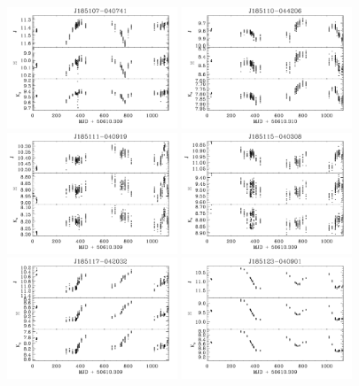 \documentclass[]{emulateapj}
\begin{document}
\begin{figure}[]
\centering
\includegraphics[width=2.0in]{new_plots/ll_22}
\includegraphics[width=2.0in]{new_plots/ll_23}
\includegraphics[width=2.0in]{new_plots/ll_24}
\includegraphics[width=2.0in]{new_plots/ll_25}
\includegraphics[width=2.0in]{new_plots/ll_26}
\includegraphics[width=2.0in]{new_plots/ll_32}

\end{figure}
\end{document}
